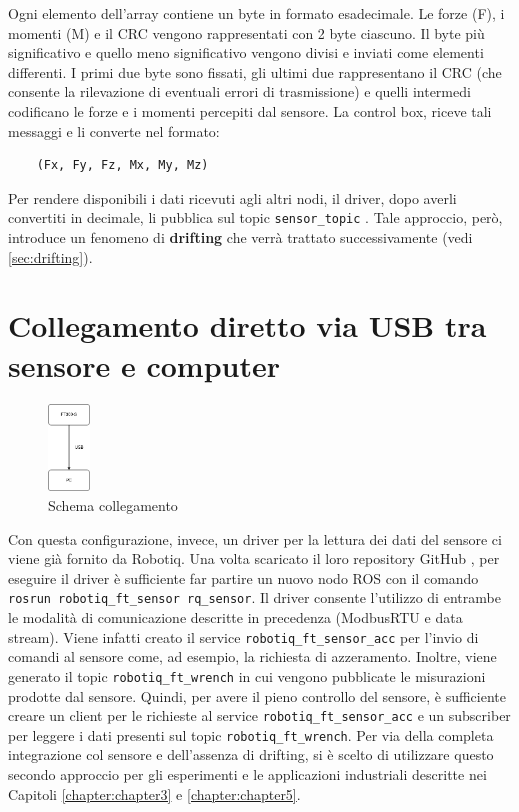 Ogni elemento dell'array contiene un byte in formato esadecimale. 
Le forze (F), i momenti (M) e il CRC vengono rappresentati con 2 byte ciascuno. Il byte pi\`{u} significativo e quello meno significativo 
vengono divisi e inviati come elementi differenti.
I primi due byte sono fissati, gli ultimi due rappresentano il CRC (che consente la rilevazione di eventuali errori di 
trasmissione) e quelli intermedi codificano le forze e i momenti percepiti dal sensore. 
La control box, riceve tali messaggi e li converte nel formato:
\begin{verbatim}
    (Fx, Fy, Fz, Mx, My, Mz)
\end{verbatim}
Per rendere disponibili i dati ricevuti agli altri nodi, il driver, dopo averli convertiti in decimale, li pubblica sul 
topic \verb|sensor_topic| \cite{ft_driver}. Tale approccio, per\`{o}, introduce un fenomeno di \textbf{drifting} che verr\`{a} 
trattato successivamente (vedi \ref{sec:drifting}).
\section{Collegamento diretto via USB tra sensore e computer}
\begin{figure}[H]
    \centering
    \includegraphics*[width=0.1\textwidth]{images/ft-pc.png}
    \caption{Schema collegamento}
    \label{fig:ft-pc}
\end{figure}
Con questa configurazione, invece, un driver per la lettura dei dati del sensore ci viene gi\`{a} fornito da Robotiq.
Una volta scaricato il loro repository GitHub \cite{robotiq_repo}, per eseguire il driver \`{e} sufficiente far partire 
un nuovo nodo ROS con il comando \verb|rosrun robotiq_ft_sensor rq_sensor|. 
Il driver consente l'utilizzo di entrambe le modalit\`{a} di comunicazione descritte in precedenza (ModbusRTU e data stream).
Viene infatti creato il service \verb|robotiq_ft_sensor_acc| per l'invio di comandi al sensore come, ad esempio, la richiesta 
di azzeramento. Inoltre, viene generato il topic \verb|robotiq_ft_wrench| in cui vengono pubblicate le misurazioni prodotte dal 
sensore. Quindi, per avere il pieno controllo del sensore, \`{e} sufficiente creare un client per le richieste al service 
\verb|robotiq_ft_sensor_acc| e un subscriber per leggere i dati presenti sul topic \verb|robotiq_ft_wrench|. 
Per via della completa integrazione col sensore e dell'assenza di drifting, 
si \`{e} scelto di utilizzare questo secondo approccio per gli esperimenti e le applicazioni industriali descritte nei 
Capitoli \ref{chapter:chapter3} e \ref{chapter:chapter5}.
